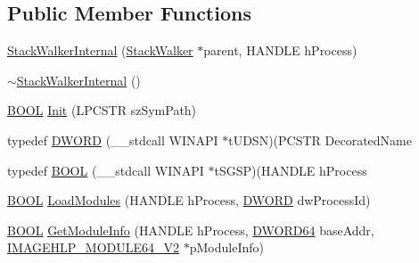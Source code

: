 \subsection*{Public Member Functions}
\begin{DoxyCompactItemize}
\item 
\hyperlink{class_stack_walker_internal_a6c2fec4e02e9cedb80c97247f083d382}{Stack\-Walker\-Internal} (\hyperlink{class_stack_walker}{Stack\-Walker} $\ast$parent, H\-A\-N\-D\-L\-E h\-Process)
\item 
\hyperlink{class_stack_walker_internal_af5a0d2c809a287f3358095fc233bdb9f}{$\sim$\-Stack\-Walker\-Internal} ()
\item 
\hyperlink{class_stack_walker_internal_a1fc4c47aaad5ff92853793d0ef3146cd}{B\-O\-O\-L} \hyperlink{class_stack_walker_internal_ae43741fbed8bb3490ec68c0052cbb411}{Init} (L\-P\-C\-S\-T\-R sz\-Sym\-Path)
\item 
typedef \hyperlink{class_stack_walker_internal_aa02cf07e5926c7dd20d31269185c52b0}{D\-W\-O\-R\-D} (\-\_\-\-\_\-stdcall W\-I\-N\-A\-P\-I $\ast$t\-U\-D\-S\-N)(P\-C\-S\-T\-R Decorated\-Name
\item 
typedef \hyperlink{class_stack_walker_internal_a1fc4c47aaad5ff92853793d0ef3146cd}{B\-O\-O\-L} (\-\_\-\-\_\-stdcall W\-I\-N\-A\-P\-I $\ast$t\-S\-G\-S\-P)(H\-A\-N\-D\-L\-E h\-Process
\item 
\hyperlink{class_stack_walker_internal_a1fc4c47aaad5ff92853793d0ef3146cd}{B\-O\-O\-L} \hyperlink{class_stack_walker_internal_a9b5578bc226c3a9b3c284e72b86c17de}{Load\-Modules} (H\-A\-N\-D\-L\-E h\-Process, \hyperlink{class_stack_walker_internal_aa02cf07e5926c7dd20d31269185c52b0}{D\-W\-O\-R\-D} dw\-Process\-Id)
\item 
\hyperlink{class_stack_walker_internal_a1fc4c47aaad5ff92853793d0ef3146cd}{B\-O\-O\-L} \hyperlink{class_stack_walker_internal_a40021bd08b408b5111264b9b0ed863fd}{Get\-Module\-Info} (H\-A\-N\-D\-L\-E h\-Process, \hyperlink{_stack_walker_8h_a97fb241c597b99bcb965858f53cacac4}{D\-W\-O\-R\-D64} base\-Addr, \hyperlink{struct_stack_walker_internal_1_1_i_m_a_g_e_h_l_p___m_o_d_u_l_e64___v2}{I\-M\-A\-G\-E\-H\-L\-P\-\_\-\-M\-O\-D\-U\-L\-E64\-\_\-\-V2} $\ast$p\-Module\-Info)
\end{DoxyCompactItemize}
